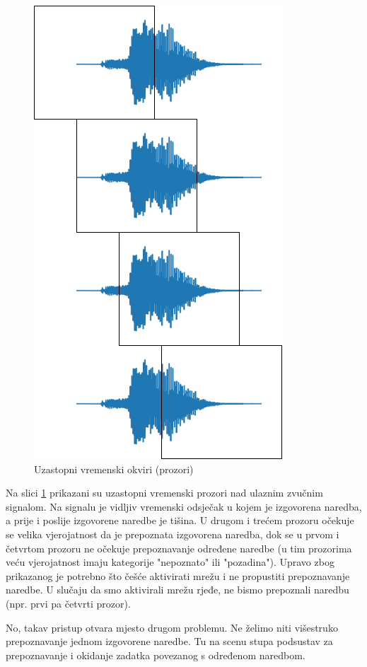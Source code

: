 \begin{figure}[htb]
    \centering
    \includegraphics[width=0.4\linewidth]{Chapters/struktura_sustava/aktivacija_nn/timeline.png}
    \caption{Uzastopni vremenski okviri (prozori) \cite{flowchart}}
    \label{pic:timeline}
\end{figure}

Na slici \ref{pic:timeline} prikazani su uzastopni vremenski prozori nad ulaznim zvučnim signalom.
Na signalu je vidljiv vremenski odsječak u kojem je izgovorena naredba, a prije i poslije
izgovorene naredbe je tišina. U drugom i trećem prozoru očekuje se velika vjerojatnost da 
je prepoznata izgovorena naredba, dok se u prvom i četvrtom prozoru ne očekuje prepoznavanje
određene naredbe (u tim prozorima veću vjerojatnost imaju kategorije "nepoznato" ili "pozadina").
Upravo zbog prikazanog je potrebno što češće aktivirati mrežu i ne propustiti prepoznavanje naredbe. 
U slučaju da smo aktivirali mrežu rjeđe, ne bismo prepoznali naredbu (npr. prvi pa četvrti
prozor). 

No, takav pristup otvara mjesto drugom problemu. Ne želimo niti višestruko prepoznavanje
jednom izgovorene naredbe. Tu na scenu stupa podsustav za prepoznavanje i okidanje zadatka
povezanog s određenom naredbom.